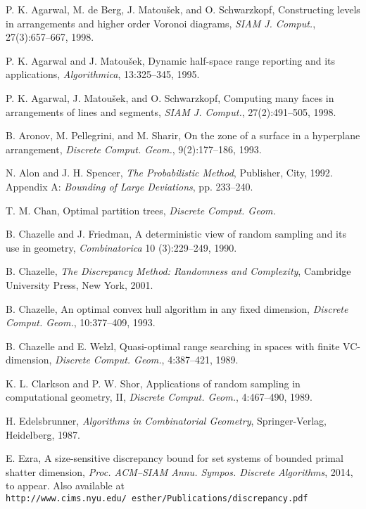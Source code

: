 \documentclass[11pt]{article}
\begin{document}
\begin{thebibliography}{}

P. K. Agarwal, M. de Berg, J. Matou\v{s}ek, and O. Schwarzkopf,
Constructing levels in arrangements and higher order Voronoi diagrams,
{\em SIAM J. Comput.}, 27(3):657--667, 1998.

P. K. Agarwal and J. Matou\v{s}ek,
Dynamic half-space range reporting and its applications,
{\em Algorithmica}, 13:325--345, 1995.

P. K. Agarwal, J. Matou\v{s}ek, and O. Schwarzkopf,
Computing many faces in arrangements of lines and segments,
{\em SIAM J. Comput.}, 27(2):491--505, 1998.

B. Aronov, M. Pellegrini, and M. Sharir,
On the zone of a surface in a hyperplane arrangement,
{\em Discrete Comput. Geom.}, 9(2):177--186, 1993.

N. Alon and J. H. Spencer,
{\em The Probabilistic Method},
Publisher, City, 1992. Appendix A: {\em Bounding of Large Deviations}, pp. 233--240.

T. M. Chan,
Optimal partition trees,
{\em Discrete Comput. Geom.}

B. Chazelle and J. Friedman,
A deterministic view of random sampling and its use in geometry,
{\em Combinatorica} 10 (3):229--249, 1990.

B. Chazelle,
{\em The Discrepancy Method: Randomness and Complexity},
Cambridge University Press, New York, 2001.

B. Chazelle,
An optimal convex hull algorithm in any fixed dimension,
{\em Discrete Comput. Geom.}, 10:377--409, 1993.

B. Chazelle and E. Welzl,
Quasi-optimal range searching in spaces with finite VC-dimension,
{\em Discrete Comput. Geom.}, 4:387--421, 1989.

K. L. Clarkson and P. W. Shor,
Applications of random sampling in computational geometry, II,
{\em Discrete Comput. Geom.}, 4:467--490, 1989.

H. Edelsbrunner,
{\em Algorithms in Combinatorial Geometry},
Springer-Verlag, Heidelberg, 1987.

E. Ezra,
A size-sensitive discrepancy bound for set systems of bounded primal
shatter dimension,
{\em Proc. ACM--SIAM Annu. Sympos. Discrete Algorithms}, 2014, to appear.
Also available at \texttt{http://www.cims.nyu.edu/~esther/Publications/discrepancy.pdf}


\end{thebibliography}
\end{document}
